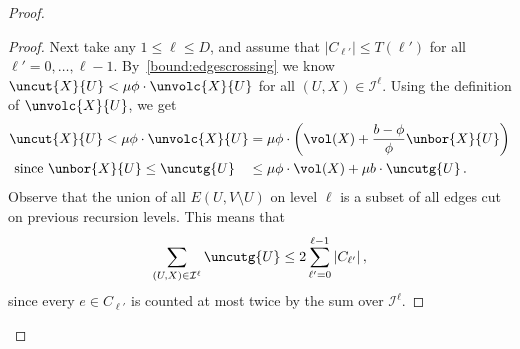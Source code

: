 \begin{proof}
\begin{proof}
Next take any $1 \le \ell \le D$, and assume that $|C_{\ell'}|\le T(\ell')$ for all $\ell'=0,\dots, \ell-1$. By~\eqref{bound:edgescrossing} we know $\uncut{X}{U} < \mu \phi \cdot \unvolc{X}{U}$ for all $(U,X) \in \mathcal{I}^\ell$. Using the definition of $\unvolc{X}{U}$, we get
	\begin{align}
		\uncut{X}{U}  < \mu \phi \cdot \unvolc{X}{U} & =  \mu \phi \cdot \left(\vol(X) + \frac{b-\phi}{\phi}\unbor{X}{U}\right) \\
		\text{since $\unbor{X}{U} \le \uncutg{U}$}\quad & \le \mu \phi \cdot \vol(X) + \mu b \cdot \uncutg{U} \, . \label{bound:cutedges}
	\end{align}
	Observe that the union of all $E(U , V \setminus U)$ on level $\ell$ is a subset of all edges cut on previous recursion levels. This means that
	\begin{equation}
		\sum_{(U,X) \in \mathcal{I}^\ell} \uncutg{U} \leq 2 \sum_{\ell' =0}^{\ell-1} |C_{\ell'}| \, ,\label{bound:cutedges_sum}
	\end{equation}
	since every $e \in C_{\ell'}$ is counted at most twice by the sum over $\mathcal{I}^\ell$.


\end{proof}
\end{proof}
